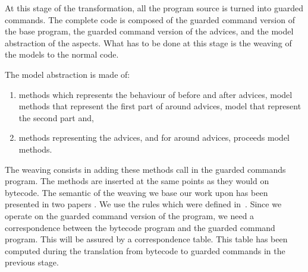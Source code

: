 At this stage of the transformation, all the program source is turned
into guarded commands. The complete code is composed of the guarded
command version of the base program, the guarded command version of
the advices, and the model abstraction of the aspects.  What has to be
done at this stage is the weaving of the models to the normal code.

The model abstraction is made of:
\begin{enumerate}
\item 
methods which represents the behaviour of before and after advices,
model methods that represent the first part of around advices, model
that represent the second part and,
\item
methods representing the advices, and for around advices, proceeds
model methods.
\end{enumerate}
The weaving consists in adding these methods call in the guarded
commands program. The methods are inserted at the same points as they
would on bytecode. The semantic of the weaving we base our work upon
has been presented in two papers \cite{weaving04,weaving06}.  We use
the rules which were defined in~\cite{weaving06}. Since we operate on
the guarded command version of the program, we need a correspondence
between the bytecode program and the guarded command program. This
will be assured by a correspondence table.  This table has been
computed during the translation from bytecode to guarded commands in
the previous stage.

